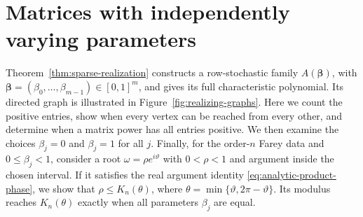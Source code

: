 \documentclass[11pt,a4paper]{article}
\theoremstyle{definition}
\theoremstyle{remark}
\numberwithin{equation}{section}
\begin{document}

\section{Matrices with independently varying parameters}\label{app:matrix-family}
Theorem~\ref{thm:sparse-realization} constructs a row-stochastic family $A(\boldsymbol\beta)$, with $\boldsymbol\beta=(\beta_0,\ldots,\beta_{m-1})\in[0,1]^m$, and gives its full characteristic polynomial. Its directed graph is illustrated in Figure~\ref{fig:realizing-graphs}. Here we count the positive entries, show when every vertex can be reached from every other, and determine when a matrix power has all entries positive. We then examine the choices $\beta_j=0$ and $\beta_j=1$ for all $j$. Finally, for the order-$n$ Farey data and $0\le\beta_j<1$, consider a root $\omega=\rho e^{i\vartheta}$ with $0<\rho<1$ and argument inside the chosen interval. If it satisfies the real argument identity \eqref{eq:analytic-product-phase}, we show that $\rho\le K_n(\theta)$, where $\theta=\min\{\vartheta,2\pi-\vartheta\}$. Its modulus reaches $K_n(\theta)$ exactly when all parameters $\beta_j$ are equal.
\end{document}
